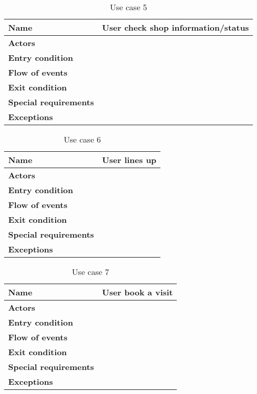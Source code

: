 \begin{table}[h!]
    \centering
    \begin{tabular}{@{}P{0.2\textwidth}P{0.70\textwidth}@{}}
        \toprule
        \textbf{Name}                 & User check shop information/status\\
        \midrule
        \textbf{Actors}               & \\
        \textbf{Entry condition}      & \\
        \textbf{Flow of events}       & \\
        \textbf{Exit condition}       & \\
        \textbf{Special requirements} & \\
        \textbf{Exceptions}           & \\
        \bottomrule
    \end{tabular}
\caption{Use case 5}
\label{table:usecase5}
\end{table}

\begin{table}[h!]
    \centering
    \begin{tabular}{@{}P{0.2\textwidth}P{0.70\textwidth}@{}}
        \toprule
        \textbf{Name}                 & User lines up\\
        \midrule
        \textbf{Actors}               & \\
        \textbf{Entry condition}      & \\
        \textbf{Flow of events}       & \\
        \textbf{Exit condition}       & \\
        \textbf{Special requirements} & \\
        \textbf{Exceptions}           & \\
        \bottomrule
    \end{tabular}
\caption{Use case 6}
\label{table:usecase6}
\end{table}

\begin{table}[h!]
    \centering
    \begin{tabular}{@{}P{0.2\textwidth}P{0.70\textwidth}@{}}
        \toprule
        \textbf{Name}                 & User book a visit\\
        \midrule
        \textbf{Actors}               & \\
        \textbf{Entry condition}      & \\
        \textbf{Flow of events}       & \\
        \textbf{Exit condition}       & \\
        \textbf{Special requirements} & \\
        \textbf{Exceptions}           & \\
        \bottomrule
    \end{tabular}
\caption{Use case 7}
\label{table:usecase7}
\end{table}

